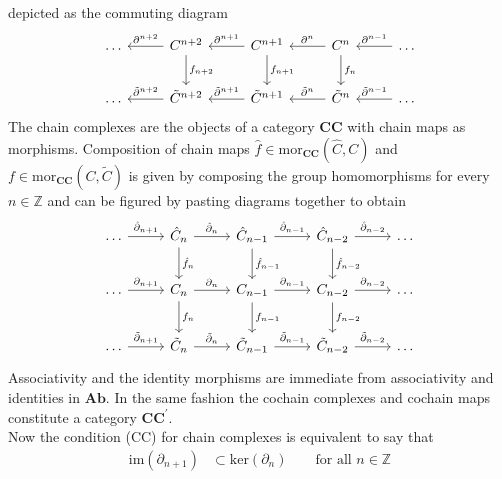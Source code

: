 depicted as the commuting diagram
\begin{equation*}
\begin{tikzcd}[row sep=2.2em,column sep=2.6em]
  \ldots
  &
  C^{n+2}
  \ar{d}{f_{n+2}}
  \ar{l}[swap]{\partial^{n+2}}
  &
  C^{n+1}
  \ar{d}{f_{n+1}}
  \ar{l}[swap]{\partial^{n+1}}
  &
  C^{n}
  \ar{d}{f_{n}}
  \ar{l}[swap]{\partial^{n}}
  &
  \ldots
  \ar{l}[swap]{\partial^{n-1}}
  \\
  \ldots
  &
  \tilde{C}^{n+2}
  \ar{l}[swap]{\tilde{\partial}^{n+2}}
  &
  \tilde{C}^{n+1}
  \ar{l}[swap]{\tilde{\partial}^{n+1}}
  &
  \tilde{C}^{n}
  \ar{l}[swap]{\tilde{\partial}^{n}}
  &
  \ldots
  \ar{l}[swap]{\tilde{\partial}^{n-1}}
\end{tikzcd}
\end{equation*}
The chain complexes are the objects of a category $\mathbf{CC}$ with chain maps as morphisms. Composition of chain maps $\hat{f} \in \mathrm{mor}_{\mathbf{CC}}(\hat{C},C)$ and $f \in \mathrm{mor}_{\mathbf{CC}}(C,\tilde{C})$ is given by composing the group homomorphisms for every $n \in \mathbb{Z}$ and can be figured by pasting diagrams together to obtain
\begin{equation*}
\begin{tikzcd}[row sep=2.2em,column sep=2.6em]
  \ldots
  \ar{r}{\hat{\partial}_{n+1}}
  &
  \hat{C}_{n}
  \ar{r}{\hat{\partial}_{n}}
  \ar{d}{\hat{f}_{n}}
  &
  \hat{C}_{n-1}
  \ar{r}{\hat{\partial}_{n-1}}
  \ar{d}{\hat{f}_{n-1}}
  &
  \hat{C}_{n-2}
  \ar{r}{\hat{\partial}_{n-2}}
  \ar{d}{\hat{f}_{n-2}}
  &
  \ldots
  \\
  \ldots
  \ar{r}{\partial_{n+1}}
  &
  C_{n}
  \ar{r}{\partial_{n}}
  \ar{d}{f_{n}}
  &
  C_{n-1}
  \ar{r}{\partial_{n-1}}
  \ar{d}{f_{n-1}}
  &
  C_{n-2}
  \ar{r}{\partial_{n-2}}
  \ar{d}{f_{n-2}}
  &
  \ldots
  \\
  \ldots
  \ar{r}{\tilde{\partial}_{n+1}}
  &
  \tilde{C}_{n}
  \ar{r}{\tilde{\partial}_{n}}
  &
  \tilde{C}_{n-1}
  \ar{r}{\tilde{\partial}_{n-1}}
  &
  \tilde{C}_{n-2}
  \ar{r}{\tilde{\partial}_{n-2}}
  &
  \ldots
\end{tikzcd}
\end{equation*}
Associativity and the identity morphisms are immediate from associativity and identities in $\mathbf{Ab}$. In the same fashion the cochain complexes and cochain maps constitute a category $\mathbf{CC^{\prime}}$.
\\
Now the condition (CC) for chain complexes is equivalent to say that
\begin{align*}
  \mathrm{im}(\partial_{n+1})
  &\subset
  \mathrm{ker}(\partial_{n})
  \qquad
  \text{for all }
  n
  \in
  \mathbb{Z}
\end{align*}
